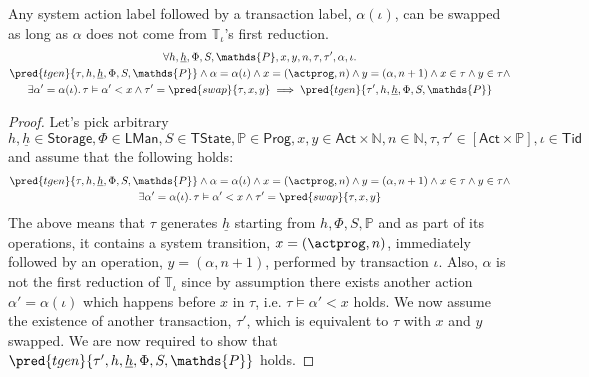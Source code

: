 \begin{lem}
	\label{lem:sysSwap}
	Any system action label followed by a transaction label, $\alpha(\iota)$, can be swapped as long as $\alpha$ does not come from $\mathds{T}_\iota$'s first reduction.
	\begin{gather}
		\forall h, \underline{h}, \Phi, S, \mathds{P}, x, y, n, \tau, \tau', \alpha, \iota \ldotp \\
		\pred{tgen}{\tau, h, \underline{h}, \Phi, S, \mathds{P}} \land \alpha = \alpha(\iota) \land x = (\actprog, n) \land y = (\alpha, n + 1) \land x \in \tau \land y \in \tau \land \\
		\exists \alpha' = \alpha(\iota) \ldotp \tau \vDash \alpha' < x \land \tau' = \pred{swap}{\tau, x, y} 
		\implies
		\pred{tgen}{\tau', h, \underline{h}, \Phi, S, \mathds{P}}
	\end{gather}
	
	\begin{proof}
	Let's pick arbitrary $h, \underline{h} \in \mathsf{Storage}, \Phi \in \mathsf{LMan}, S \in \mathsf{TState}, \mathds{P} \in \mathsf{Prog}, x, y \in \mathsf{Act} \times \mathds{N}, n \in \mathds{N}, \tau, \tau' \in [\mathsf{Act} \times \mathds{P}], \iota \in \mathsf{Tid}$ and assume that the following holds:
	\begin{gather}
		\pred{tgen}{\tau, h, \underline{h}, \Phi, S, \mathds{P}} \land \alpha = \alpha(\iota) \land x = (\actprog, n) \land y = (\alpha, n + 1) \land x \in \tau \land y \in \tau \land \\
		\exists \alpha' = \alpha(\iota) \ldotp \tau \vDash \alpha' < x \land \tau' = \pred{swap}{\tau, x, y}
	\end{gather}
	The above means that $\tau$ generates $\underline{h}$ starting from $h, \Phi, S, \mathds{P}$ and as part of its operations, it contains a system transition, $x = (\actprog, n)$, immediately followed by an operation, $y = (\alpha, n+1)$, performed by transaction $\iota$. Also, $\alpha$ is not the first reduction of $\mathds{T}_\iota$ since by assumption there exists another action $\alpha' = \alpha(\iota)$ which happens before $x$ in $\tau$, i.e. $\tau \vDash \alpha' < x$ holds. We now assume the existence of another transaction, $\tau'$, which is equivalent to $\tau$ with $x$ and $y$ swapped. We are now required to show that $\pred{tgen}{\tau', h, \underline{h}, \Phi, S, \mathds{P}}$ holds.
	

\end{proof}
\end{lem}
